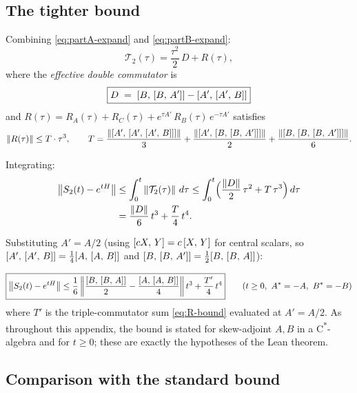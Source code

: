 \subsection{The tighter bound}

Combining \eqref{eq:partA-expand} and \eqref{eq:partB-expand}:
\begin{equation}\label{eq:T2-refined}
  \mathcal{T}_2(\tau) = \frac{\tau^2}{2}\,D + R(\tau),
\end{equation}
where the \emph{effective double commutator} is
\begin{equation}\label{eq:D-def}
  \boxed{D \;=\; [B,\,[B,\,A']] - [A',\,[A',\,B]]}
\end{equation}
and $R(\tau) = R_A(\tau) + R_C(\tau) + e^{\tau A'}\,R_B(\tau)\,e^{-\tau A'}$
satisfies
\begin{equation}\label{eq:R-bound}
  \left\|R(\tau)\right\| \le T \cdot \tau^3,
  \qquad
  T = \frac{\left\|[A',\,[A',\,[A',\,B]]]\right\|}{3}
    + \frac{\left\|[A',\,[B,\,[B,\,A']]]\right\|}{2}
    + \frac{\left\|[B,\,[B,\,[B,\,A']]]\right\|}{6}.
\end{equation}

Integrating:
\begin{align}
  \left\|S_2(t) - e^{tH}\right\|
    &\le \int_0^t \left\|\mathcal{T}_2(\tau)\right\|\,d\tau
    \le \int_0^t \Bigl(\frac{\left\|D\right\|}{2}\,\tau^2 + T\,\tau^3\Bigr)\,d\tau
    \notag \\
    &= \frac{\left\|D\right\|}{6}\,t^3 + \frac{T}{4}\,t^4.
    \label{eq:strang-tighter}
\end{align}

Substituting $A' = A/2$ (using $[cX,\,Y] = c\,[X,\,Y]$ for
central scalars, so $[A',\,[A',\,B]] = \tfrac{1}{4}[A,\,[A,\,B]]$
and $[B,\,[B,\,A']] = \tfrac{1}{2}[B,\,[B,\,A]]$):

\begin{equation}\label{eq:strang-tighter-final}
  \boxed{
  \left\|S_2(t) - e^{tH}\right\|
    \le \frac{1}{6}\left\|\frac{[B,\,[B,\,A]]}{2}
      - \frac{[A,\,[A,\,B]]}{4}\right\| t^3
    + \frac{T'}{4}\,t^4
  }
  \qquad (t \ge 0,\ A^* = -A,\ B^* = -B)
\end{equation}
where $T'$ is the triple-commutator sum \eqref{eq:R-bound} evaluated at
$A' = A/2$. As throughout this appendix, the bound is stated for skew-adjoint
$A, B$ in a C\textsuperscript{*}-algebra and for $t \ge 0$; these are exactly the
hypotheses of the Lean theorem.

\subsection{Comparison with the standard bound}
\label{sec:comparison-standard}

